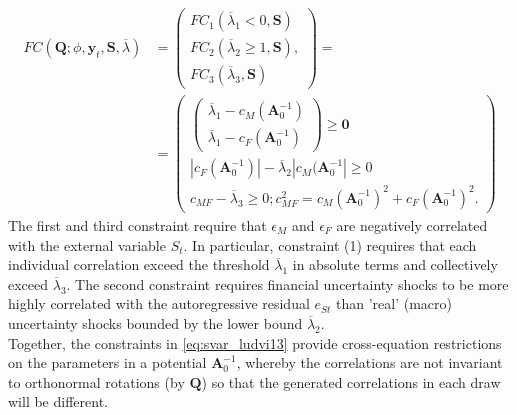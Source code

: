 \documentclass[a4paper,11pt,listof=nochaptergap,oneside,pointednumbers,bibtotoc,bigheadings,liststotoc]{scrbook}
\theoremstyle{mysatz}
\theoremstyle{mydefinition}
\theoremstyle{mybemerkung}
\newcommand{\vect}[1]{\boldsymbol{\mathbf{#1}}}
\begin{document}
\begin{itemize}
\begin{equation} \label{eq:svar_ludvi13}
\begin{split}
	FC(\vect{Q}; \phi, \vect{y}_t, \vect{S}, \overline{\lambda}) & = \begin{pmatrix}
	FC_1(\overline{\lambda}_1 < 0, \vect{S})\\
	 FC_2(\overline{\lambda}_2 \geq 1, \vect{S}), \\
	 FC_3(\overline{\lambda}_3, \vect{S})
	\end{pmatrix} = \\
	& = \begin{pmatrix}
	 		\begin{pmatrix}
	 			\overline{\lambda}_1 - c_M(\vect{A}_0^{-1})\\
				\overline{\lambda}_1 - c_F(\vect{A}_0^{-1})
			\end{pmatrix} \geq \vect{0} \\
			|c_F(\vect{A}_0^{-1})| - \overline{\lambda}_2|c_M(\vect{A}_0^{-1}| \geq 0 \\
			c_{MF} - \overline{\lambda}_3 \geq 0; c_{MF}^2 = c_M(\vect{A}_0^{-1})^2 + c_F(\vect{A}_0^{-1})^2.
	\end{pmatrix} 
\end{split}								
\end{equation}
The first and third constraint require that $\epsilon_M$ and $\epsilon_F$ are negatively correlated with the external variable $S_t$. In particular, constraint (1) requires that each individual correlation exceed the threshold $\overline{\lambda}_1$ in absolute terms and collectively exceed $\overline{\lambda}_3$. The second constraint requires financial uncertainty shocks to be more highly correlated with the autoregressive residual $e_{St}$ than 'real' (macro) uncertainty shocks bounded by the lower bound $\overline{\lambda}_2$.\\
Together, the constraints in \ref{eq:svar_ludvi13} provide cross-equation restrictions on the parameters in a potential $\vect{A}_0^{-1}$, whereby the correlations are not invariant to orthonormal rotations (by $\vect{Q}$) so that the generated correlations in each draw will be different.


\end{itemize}
\end{document}
